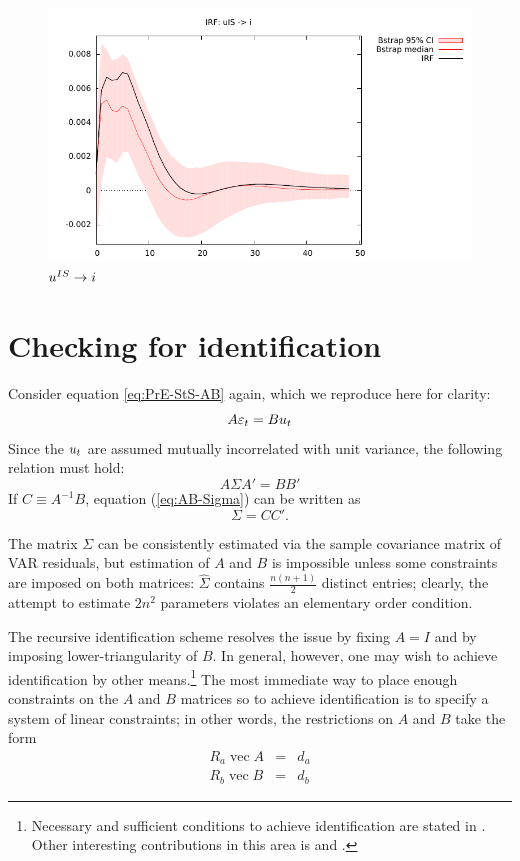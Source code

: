 \documentclass[a4paper,10pt]{article}
\newcommand{\PrE}[1]{\ensuremath \varepsilon_{#1}}
\newcommand{\StS}[1]{\ensuremath u_{#1}}
\DeclareMathOperator{\VEC}{\mathrm{vec}}
\begin{document}
\begin{figure}[htbp]
  \centering
  \includegraphics{dynamic_IS}
  \caption{$\StS{}^{IS} \to i$}
  \label{fig:Dynamic-IS}
\end{figure}

\section{Checking for identification}
\label{sec:SVARid}

Consider equation \eqref{eq:PrE-StS-AB} again, which we reproduce
here for clarity:
\[
  A \PrE{t} = B \StS{t}
\]
Since the $\StS{t}$ are assumed mutually incorrelated with unit variance,
the following relation must hold:
\begin{equation}
  \label{eq:AB-Sigma}
  A \Sigma A' = B B'
\end{equation}
If $C \equiv A^{-1}B$, equation (\ref{eq:AB-Sigma}) can be written as
\[
  \Sigma = C C'.
\]

The matrix $\Sigma$ can be consistently estimated via the sample
covariance matrix of VAR residuals, but estimation of $A$ and $B$ is
impossible unless some constraints are imposed on both matrices:
$\hat{\Sigma}$ contains $\frac{n (n+1)}{2}$ distinct entries; clearly,
the attempt to estimate $2 n^2$ parameters violates an elementary
order condition. 

The recursive identification scheme resolves the issue by fixing $A=I$
and by imposing lower-triangularity of $B$. In general, however, one
may wish to achieve identification by other means.\footnote{Necessary
  and sufficient conditions to achieve identification are stated in
  \cite{ET06}. Other interesting contributions in this area is
  \cite{RR-W-Zha10} and \cite{Bacchiocchi11}.}  The most immediate way
to place enough constraints on the $A$ and $B$ matrices so to achieve
identification is to specify a system of linear constraints; in other
words, the restrictions on $A$ and $B$ take the form
\begin{eqnarray}
  \label{eq:ImpConstA}
  R_a \VEC A & = & d_a \\
  \label{eq:ImpConstB}
  R_b \VEC B & = & d_b 
\end{eqnarray}
\end{document}
